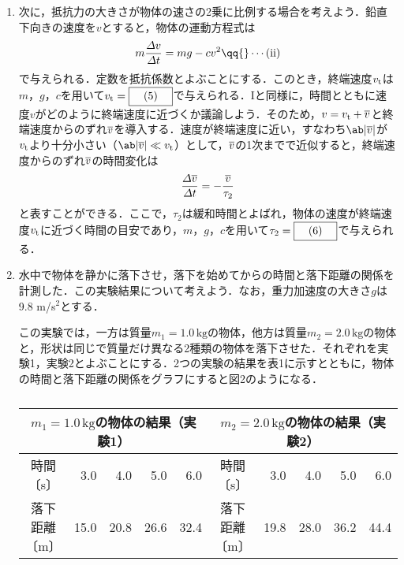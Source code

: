 \begin{enumerate}[I]
  \item {\hzw}次に，抵抗力の大きさが物体の速さの2乗に比例する場合を考えよう．鉛直下向きの速度を$v$とすると，物体の運動方程式は
  \begin{gather*}
    m\frac{\varDelta v}{\varDelta t} = mg - cv^2 \qq{} \cdots \text{(ii)}
  \end{gather*}
  で与えられる．定数を抵抗係数とよぶことにする．このとき，終端速度$v_\mathrm{t}$は$m$，$g$，$c$を用いて$v_\mr{t} = \text{\boxnum{5}}$で与えられる．Iと同様に，時間とともに速度$v$がどのように終端速度に近づくか議論しよう．そのため，$v = v_\mathrm{t} + \overline{v}$と終端速度からのずれ$\overline{v}$を導入する．速度が終端速度に近い，すなわち$\ab|\ol{v}|$が$v_\mathrm{t}$より十分小さい（$\ab|\ol{v}| \ll v_\mr{t}$）として，$\overline{v}$の1次までで近似すると，終端速度からのずれ$\overline{v}$の時間変化は
  \begin{gather*}
    \frac{\varDelta \overline{v}}{\varDelta t} = -\frac{\overline{v}}{\tau_2}
  \end{gather*}
  と表すことができる．ここで，$\tau_2$は緩和時間とよばれ，物体の速度が終端速度$v_\mathrm{t}$に近づく時間の目安であり，$m$，$g$，$c$を用いて$\tau_2 = \text{\boxnum{6}}$で与えられる．

  \item {\hzw}水中で物体を静かに落下させ，落下を始めてからの時間と落下距離の関係を計測した．この実験結果について考えよう．なお，重力加速度の大きさ$g$は9.8 m/s${}^2$とする．

  {\hzw}この実験では，一方は質量$m_1 = 1.0 \, \text{kg}$の物体，他方は質量$m_2 = 2.0 \, \text{kg}$の物体と，形状は同じで質量だけ異なる2種類の物体を落下させた．それぞれを実験1，実験2とよぶことにする．2つの実験の結果を表1に示すとともに，物体の時間と落下距離の関係をグラフにすると図2のようになる．
  \begin{table}[H]
    \centering
    \caption{}
    \begin{tabular}[H]{|c|r|r|r|r|c|r|r|r|r|}
      \hline
      \multicolumn{5}{|c|}{$m_1=1.0\,\text{kg}$の物体の結果（実験1）} & \multicolumn{5}{c|}{$m_2 = 2.0 \, \text{kg}$の物体の結果（実験2）}\\
      \hline
      時間〔s〕& 3.0 & 4.0 & 5.0 & 6.0 & 時間〔s〕& 3.0 & 4.0 & 5.0 & 6.0 \\
      \hline
      落下距離〔m〕 & 15.0 & 20.8 & 26.6 & 32.4 & 落下距離〔m〕 & 19.8 & 28.0 & 36.2 & 44.4\\
      \hline
    \end{tabular}
  \end{table}



\end{enumerate}
